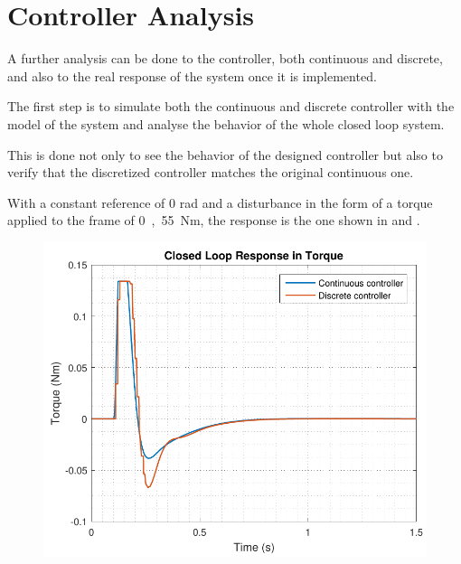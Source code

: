 \section{Controller Analysis}\label{ssec:ControllerVerification}
A further analysis can be done to the controller, both continuous and discrete, and also to the real response of the system once it is implemented.

The first step is to simulate both the continuous and discrete controller with the model of the system and analyse the behavior of the whole closed loop system.

This is done not only to see the behavior of the designed controller but also to verify that the discretized controller matches the original continuous one. 

With a constant reference of 0 rad and a disturbance in the form of a torque applied to the frame of \si{0,55 Nm}, the response is the one shown in  and .
%
\begin{minipage}{0.45\linewidth}
	\begin{figure}[H]
      \includegraphics[scale=.53]{figures/torqueComp}
      \captionsetup{justification=centering}
      \label{discreteVsContinuousOutputController}
    \end{figure}\vspace{-5mm}
\end{minipage}
